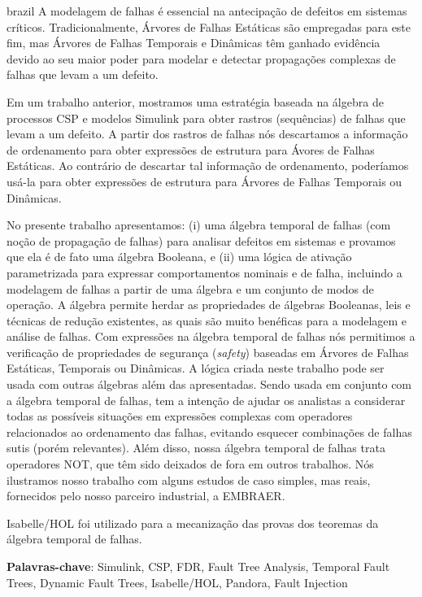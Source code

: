 \documentclass[12pt,openright,twoside,a4paper,oldfontcommands,english,brazil,final]{abntex2}
\theoremstyle{theo}
\begin{document}
\begin{resumo}[Resumo]
\begin{otherlanguage*}{brazil}
A modelagem de falhas é essencial na antecipação de defeitos em sistemas críticos.
Tradicionalmente, Árvores de Falhas Estáticas são empregadas para este fim, mas Árvores de Falhas Temporais e Dinâmicas têm ganhado evidência devido ao seu maior poder para modelar e detectar propagações complexas de falhas que levam a um defeito.

Em um trabalho anterior, mostramos uma estratégia baseada na álgebra de processos CSP e modelos Simulink para obter rastros (sequências) de falhas que levam a um defeito.
A partir dos rastros de falhas nós descartamos a informação de ordenamento para obter expressões de estrutura  para Ávores de Falhas Estáticas.
Ao contrário de descartar tal informação de ordenamento, poderíamos usá-la para obter expressões de estrutura para Árvores de Falhas Temporais ou Dinâmicas.

No presente trabalho apresentamos: (i) uma álgebra temporal de falhas (com noção de propagação de falhas) para analisar defeitos em sistemas e provamos que ela é de fato uma álgebra Booleana, e (ii) uma lógica de ativação parametrizada para expressar comportamentos nominais e de falha, incluindo a modelagem de falhas a partir de uma álgebra e um conjunto de modos de operação.
A álgebra permite herdar as propriedades de álgebras Booleanas, leis e técnicas de redução existentes, as quais são muito benéficas para a modelagem e análise de falhas.
Com expressões na álgebra temporal de falhas nós permitimos a verificação de propriedades de segurança (\emph{safety}) baseadas em Árvores de Falhas Estáticas, Temporais ou Dinâmicas.
A lógica criada neste trabalho pode ser usada com outras álgebras além das apresentadas.
Sendo usada em conjunto com a álgebra temporal de falhas, tem a intenção de ajudar os analistas a considerar todas as possíveis situações em expressões complexas com operadores relacionados ao ordenamento das falhas, evitando esquecer combinações de falhas sutis (porém relevantes).
Além disso, nossa álgebra temporal de falhas trata operadores NOT, que têm sido deixados de fora em outros trabalhos.
Nós ilustramos nosso trabalho com alguns estudos de caso simples, mas reais, fornecidos pelo nosso parceiro industrial, a EMBRAER.

Isabelle/HOL foi utilizado para a mecanização das provas dos teoremas da álgebra temporal de falhas.

\vspace{\onelineskip}
\noindent
\textbf{Palavras-chave}: Simulink, CSP, FDR, Fault Tree Analysis, Temporal Fault Trees, Dynamic Fault Trees, Isabelle/HOL, Pandora, Fault Injection
\end{otherlanguage*}
\end{resumo}
\end{document}
